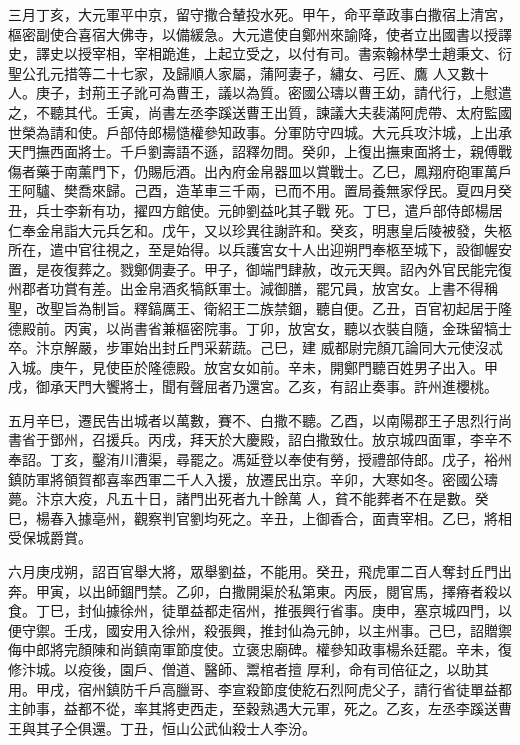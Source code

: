 \begin{pinyinscope}
 三月丁亥，大元軍平中京，留守撒合輦投水死。甲午，命平章政事白撒宿上清宮，樞密副使合喜宿大佛寺，以備緩急。大元遣使自鄭州來諭降，使者立出國書以授譯史，譯史以授宰相，宰相跪進，上起立受之，以付有司。書索翰林學士趙秉文、衍聖公孔元措等二十七家，及歸順人家屬，蒲阿妻子，繡女、弓匠、鷹
 人又數十人。庚子，封荊王子訛可為曹王，議以為質。密國公璹以曹王幼，請代行，上慰遣之，不聽其代。壬寅，尚書左丞李蹊送曹王出質，諫議大夫裴滿阿虎帶、太府監國世榮為請和使。戶部侍郎楊慥權參知政事。分軍防守四城。大元兵攻汴城，上出承天門撫西面將士。千戶劉壽語不遜，詔釋勿問。癸卯，上復出撫東面將士，親傅戰傷者藥于南薰門下，仍賜卮酒。出內府金帛器皿以賞戰士。乙巳，鳳翔府砲軍萬戶王阿驢、樊喬來歸。己酉，造革車三千兩，已而不用。置局養無家俘民。夏四月癸丑，兵士李新有功，擢四方館使。元帥劉益叱其子戰
 死。丁巳，遣戶部侍郎楊居仁奉金帛詣大元兵乞和。戊午，又以珍異往謝許和。癸亥，明惠皇后陵被發，失柩所在，遣中官往視之，至是始得。以兵護宮女十人出迎朔門奉柩至城下，設御幄安置，是夜復葬之。戮鄭倜妻子。甲子，御端門肆赦，改元天興。詔內外官民能完復州郡者功賞有差。出金帛酒炙犒飫軍士。減御膳，罷冗員，放宮女。上書不得稱聖，改聖旨為制旨。釋鎬厲王、衛紹王二族禁錮，聽自便。乙丑，百官初起居于隆德殿前。丙寅，以尚書省兼樞密院事。丁卯，放宮女，聽以衣裝自隨，金珠留犒士卒。汴京解嚴，步軍始出封丘門采薪蔬。己巳，建
 威都尉完顏兀論同大元使沒忒入城。庚午，見使臣於隆德殿。放宮女如前。辛未，開鄭門聽百姓男子出入。甲戌，御承天門大饗將士，聞有聲屈者乃還宮。乙亥，有詔止奏事。許州進櫻桃。



 五月辛巳，遷民告出城者以萬數，賽不、白撒不聽。乙酉，以南陽郡王子思烈行尚書省于鄧州，召援兵。丙戌，拜天於大慶殿，詔白撒致仕。放京城四面軍，李辛不奉詔。丁亥，鑿洧川漕渠，尋罷之。馮延登以奉使有勞，授禮部侍郎。戊子，裕州鎮防軍將領賀都喜率西軍二千人入援，放遷民出京。辛卯，大寒如冬。密國公璹薨。汴京大疫，凡五十日，諸門出死者九十餘萬
 人，貧不能葬者不在是數。癸巳，楊春入據亳州，觀察判官劉均死之。辛丑，上御香合，面責宰相。乙巳，將相受保城爵賞。



 六月庚戌朔，詔百官舉大將，眾舉劉益，不能用。癸丑，飛虎軍二百人奪封丘門出奔。甲寅，以出師錮門禁。乙卯，白撒開渠於私第東。丙辰，閱官馬，擇瘠者殺以食。丁巳，封仙據徐州，徒單益都走宿州，推張興行省事。庚申，塞京城四門，以便守禦。壬戌，國安用入徐州，殺張興，推封仙為元帥，以主州事。己巳，詔贈禦侮中郎將完顏陳和尚鎮南軍節度使。立褒忠廟碑。權參知政事楊糸廷罷。辛未，復修汴城。以疫後，園戶、僧道、醫師、鬻棺者擅
 厚利，命有司倍征之，以助其用。甲戌，宿州鎮防千戶高臘哥、李宣殺節度使紇石烈阿虎父子，請行省徒單益都主帥事，益都不從，率其將吏西走，至穀熟遇大元軍，死之。乙亥，左丞李蹊送曹王與其子仝俱還。丁丑，恒山公武仙殺士人李汾。




\end{pinyinscope}
